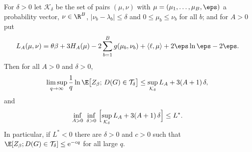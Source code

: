 \begin{lemma}\label{lem:iid-limit}
For $\delta>0$ let $\mathcal{K}_\delta$ be the set of pairs $(\mu,\nu)$ with
$\mu=(\mu_1,\dots,\mu_B,\eps)$ a probability vector, $\nu\in\R^B$,
$|\nu_b-\lambda_b|\le\delta$ and $0\le\mu_b\le\nu_b$ for all $b$; and for $A>0$ put
\[
L_A(\mu,\nu)=\theta\beta+3H_A(\mu)-2\sum_{b=1}^Bg(\mu_b,\nu_b)+\langle\ell,\mu\rangle
+2\eps\ln\eps-2\eps .
\]
Then for all $A>0$ and $\delta>0$,
\begin{equation}\label{eq:iid-limsup}
\limsup_{q\to\infty}\frac1q\ln\E\bigl[Z_\beta;\,D(G)\in\mathcal{T}_\delta\bigr]
\le\sup_{\mathcal{K}_\delta}L_A+3(A+1)\,\delta,
\end{equation}
and
\begin{equation}\label{eq:iid-inf}
\inf_{A>0}\ \inf_{\delta>0}\ \Bigl[\sup_{\mathcal{K}_\delta}L_A+3(A+1)\,\delta\Bigr]\le L^\ast .
\end{equation}
In particular, if $L^\ast<0$ there are $\delta>0$ and $c>0$ such that
$\E[Z_\beta;D(G)\in\mathcal{T}_\delta]\le\mathrm{e}^{-cq}$ for all large $q$.
\end{lemma}

